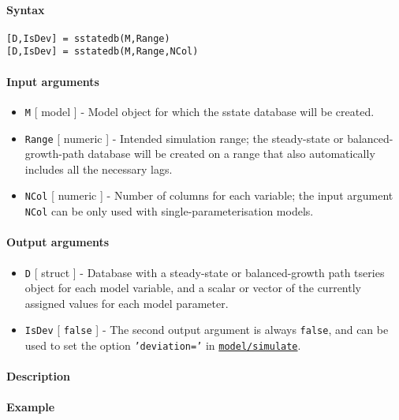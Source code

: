 


	\paragraph{Syntax}\label{syntax}

\begin{verbatim}
[D,IsDev] = sstatedb(M,Range)
[D,IsDev] = sstatedb(M,Range,NCol)
\end{verbatim}

\paragraph{Input arguments}\label{input-arguments}

\begin{itemize}
\item
  \texttt{M} {[} model {]} - Model object for which the sstate database
  will be created.
\item
  \texttt{Range} {[} numeric {]} - Intended simulation range; the
  steady-state or balanced-growth-path database will be created on a
  range that also automatically includes all the necessary lags.
\item
  \texttt{NCol} {[} numeric {]} - Number of columns for each variable;
  the input argument \texttt{NCol} can be only used with
  single-parameterisation models.
\end{itemize}

\paragraph{Output arguments}\label{output-arguments}

\begin{itemize}
\item
  \texttt{D} {[} struct {]} - Database with a steady-state or
  balanced-growth path tseries object for each model variable, and a
  scalar or vector of the currently assigned values for each model
  parameter.
\item
  \texttt{IsDev} {[} \texttt{false} {]} - The second output argument is
  always \texttt{false}, and can be used to set the option
  \texttt{'deviation='} in
  \href{model/simulate}{\texttt{model/simulate}}.
\end{itemize}

\paragraph{Description}\label{description}

\paragraph{Example}\label{example}


